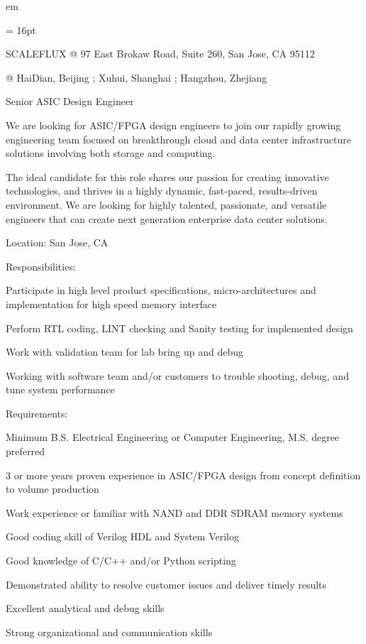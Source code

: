 

 em

\FFrh \baselineskip = 16pt



\centerline{
SCALEFLUX @ 97 East Brokaw Road,
Suite 260,
San Jose, CA 95112
} 
\centerline{
@ HaiDian, Beijing ; Xuhui, Shanghai ; Hangzhou, Zhejiang
} 

\par Senior ASIC Design Engineer
\par We are looking for ASIC/FPGA design engineers to join our rapidly growing engineering team focused on breakthrough cloud and data center infrastructure solutions involving both storage and computing.
\par The ideal candidate for this role shares our passion for creating innovative technologies, and thrives in a highly dynamic, fast-paced, results-driven environment. We are looking for highly talented, passionate, and versatile engineers that can create next generation enterprise data center solutions.
\par Location: San Jose, CA
\par Responsibilities:
\par Participate in high level product specifications, micro-architectures and implementation for high speed memory interface
\par Perform RTL coding, LINT checking and Sanity testing for implemented design
\par Work with validation team for lab bring up and debug
\par Working with software team and/or customers to trouble shooting, debug, and tune system performance
\par Requirements:
\par Minimum B.S. Electrical Engineering or Computer Engineering, M.S. degree preferred
\par 3 or more years proven experience in ASIC/FPGA design from concept definition to volume production
\par Work experience or familiar with NAND and DDR SDRAM memory systems
\par Good coding skill of Verilog HDL and System Verilog
\par Good knowledge of C/C++ and/or Python scripting
\par Demonstrated ability to resolve customer issues and deliver timely results
\par Excellent analytical and debug skills
\par Strong organizational and communication skills

